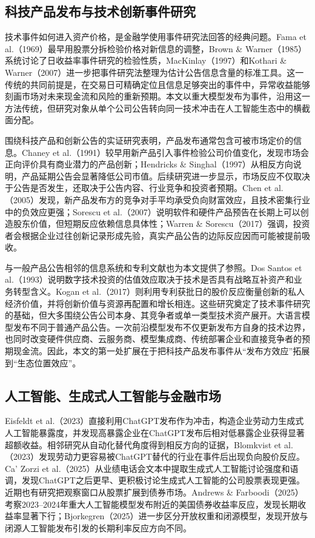\documentclass[11pt,fontset=fandol,a4paper]{ctexart}
\begin{document}
\subsection{科技产品发布与技术创新事件研究}

技术事件如何进入资产价格，是金融学使用事件研究法回答的经典问题。Fama et al.（1969）最早用股票分拆检验价格对新信息的调整，Brown \& Warner（1985）系统讨论了日收益率事件研究的检验性质，MacKinlay（1997）和Kothari \& Warner（2007）进一步把事件研究法整理为估计公告信息含量的标准工具。这一传统的共同前提是，在交易日可精确定位且信息足够突出的事件中，异常收益能够刻画市场对未来现金流和风险的重新预期。本文以重大模型发布为事件，沿用这一方法传统，但研究对象从单个公司公告转向同一技术冲击在人工智能生态中的横截面分配。

围绕科技产品和创新公告的实证研究表明，产品发布通常包含可被市场定价的信息。Chaney et al.（1991）较早用新产品引入事件检验公司价值变化，发现市场会正向评价具有商业潜力的产品创新；Hendricks \& Singhal（1997）从相反方向说明，产品延期公告会显著降低公司市值。后续研究进一步显示，市场反应不仅取决于公告是否发生，还取决于公告内容、行业竞争和投资者预期。Chen et al.（2005）发现，新产品发布方的竞争对手平均承受负向财富效应，且技术密集行业中的负效应更强；Sorescu et al.（2007）说明软件和硬件产品预告在长期上可以创造股东价值，但短期反应依赖信息具体性；Warren \& Sorescu（2017）强调，投资者会根据企业过往创新记录形成先验，真实产品公告的边际反应因而可能被提前吸收。

与一般产品公告相邻的信息系统和专利文献也为本文提供了参照。Dos Santos et al.（1993）说明数字技术投资的估值效应取决于技术是否具有战略互补资产和业务转型含义。Kogan et al.（2017）则利用专利获批日的股价反应衡量创新的私人经济价值，并将创新价值与资源再配置和增长相连。这些研究奠定了技术事件研究的基础，但大多围绕公告公司本身、其竞争者或单一类型技术资产展开。大语言模型发布不同于普通产品公告。一次前沿模型发布不仅更新发布方自身的技术边界，也同时改变硬件供应商、云服务商、模型集成商、传统部署企业和直接竞争者的预期现金流。因此，本文的第一处扩展在于把科技产品发布事件从“发布方效应”拓展到“生态位置效应”。

\subsection{人工智能、生成式人工智能与金融市场}

Eisfeldt et al.（2023）直接利用ChatGPT发布作为冲击，构造企业劳动力生成式人工智能暴露度，并发现高暴露企业在ChatGPT发布后相对低暴露企业获得显著超额收益。相邻研究从自动化替代角度得到相反方向的证据，Blomkvist et al.（2023）发现劳动力更容易被ChatGPT替代的行业在事件后出现负向股价反应。Ca' Zorzi et al.（2025）从业绩电话会文本中提取生成式人工智能讨论强度和语调，发现ChatGPT之后更早、更积极讨论生成式人工智能的公司股票表现更强。近期也有研究把观察窗口从股票扩展到债券市场。Andrews \& Farboodi（2025）考察2023--2024年重大人工智能模型发布附近的美国债券收益率反应，发现长期收益率显著下行；Bjorkegren（2025）进一步区分开放权重和闭源模型，发现开放与闭源人工智能发布引发的长期利率反应方向不同。
\end{document}
